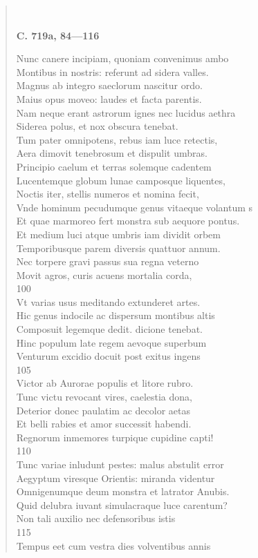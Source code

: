 \documentclass[11pt, a4paper]{report}
\begin{document}
\begin{verse}
        ﻿\pagebreak 
     \marginpar{[192]} \begin{center} \textbf{C. 719a, 84—116} \end{center}Nunc canere incipiam, quoniam convenimus ambo \\ Montibus in nostris: referunt ad sidera valles. \\ Magnus ab integro saeclorum nascitur ordo. \\ Maius opus moveo: laudes et facta parentis. \\ Nam neque erant astrorum ignes nec lucidus aethra \\ Siderea polus, et nox obscura tenebat. \\ Tum pater omnipotens, rebus iam luce retectis, \\ Aera dimovit tenebrosum et dispulit umbras. \\ Principio caelum et terras solemque cadentem \\ Lucentemque globum lunae camposque liquentes, \\ Noctis iter, stellis numeros et nomina fecit, \\ Vnde hominum pecudumque genus vitaeque volantum s \\ Et quae marmoreo fert monstra sub aequore pontus. \\ Et medium luci atque umbris iam dividit orbem \\ Temporibusque parem diversis quattuor annum. \\ Nec torpere gravi passus sua regna veterno \\ Movit agros, curis acuens mortalia corda, \\ 100 \\ Vt varias usus meditando extunderet artes. \\ Hic genus indocile ac dispersum montibus altis \\ Composuit legemque dedit. dicione tenebat. \\ Hinc populum late regem aevoque superbum \\ Venturum excidio docuit post exitus ingens \\ 105 \\ Victor ab Aurorae populis et litore rubro. \\ Tunc victu revocant vires, caelestia dona, \\ Deterior donec paulatim ac decolor aetas \\ Et belli rabies et amor successit habendi. \\ Regnorum inmemores turpique cupidine capti! \\ 110 \\ Tunc variae inludunt pestes: malus abstulit error \\ Aegyptum viresque Orientis: miranda videntur \\ Omnigenumque deum monstra et latrator Anubis. \\ Quid delubra iuvant simulacraque luce carentum? \\ Non tali auxilio nec defensoribus istis \\ 115 \\ Tempus eet cum vestra dies volventibus annis \\ 

\end{verse}
\end{document}
